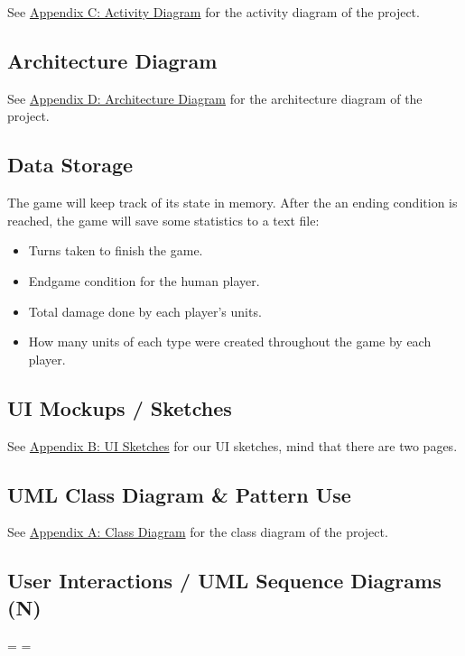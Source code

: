 \documentclass[11pt]{amsart}
\begin{document}
See \hyperref[sec:appendixc]{Appendix C: Activity Diagram} for the activity diagram of the project.

\subsection*{Architecture Diagram} \phantom{}

See \hyperref[sec:appendixd]{Appendix D: Architecture Diagram} for the architecture diagram of the project.

\subsection*{Data Storage} \phantom{}

The game will keep track of its state in memory. After the an ending condition is reached, the game will save some statistics to a text file:
\begin{itemize}
    \item Turns taken to finish the game.
    \item Endgame condition for the human player.
    \item Total damage done by each player's units.
    \item How many units of each type were created throughout the game by each player.
\end{itemize}

\subsection*{UI Mockups / Sketches} \phantom{}

See \hyperref[sec:appendixb]{Appendix B: UI Sketches} for our UI sketches, mind that there are two pages.
\subsection*{UML Class Diagram \& Pattern Use} \phantom{}

See \hyperref[sec:appendixa]{Appendix A: Class Diagram} for the class diagram of the project.

\subsection*{User Interactions / UML Sequence Diagrams (N)} \phantom{}


\newpage
\paperwidth=20in
\paperheight=10in
\pdfpagewidth=\paperwidth
\pdfpageheight=\paperheight
\end{document}
